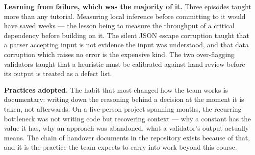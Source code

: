 \textbf{Learning from failure, which was the majority of it.} Three episodes
taught more than any tutorial. Measuring local inference before committing to it
would have saved weeks --- the lesson being to measure the throughput of a
critical dependency before building on it. The silent JSON escape corruption
taught that a parser accepting input is not evidence the input was understood,
and that data corruption which raises no error is the expensive kind. The two
over-flagging validators taught that a heuristic must be calibrated against hand
review before its output is treated as a defect list.

\textbf{Practices adopted.} The habit that most changed how the team works is
documentary: writing down the reasoning behind a decision at the moment it is
taken, not afterwards. On a five-person project spanning months, the recurring
bottleneck was not writing code but recovering context --- why a constant has the
value it has, why an approach was abandoned, what a validator's output actually
means. The chain of handover documents in the repository exists because of that,
and it is the practice the team expects to carry into work beyond this course.
